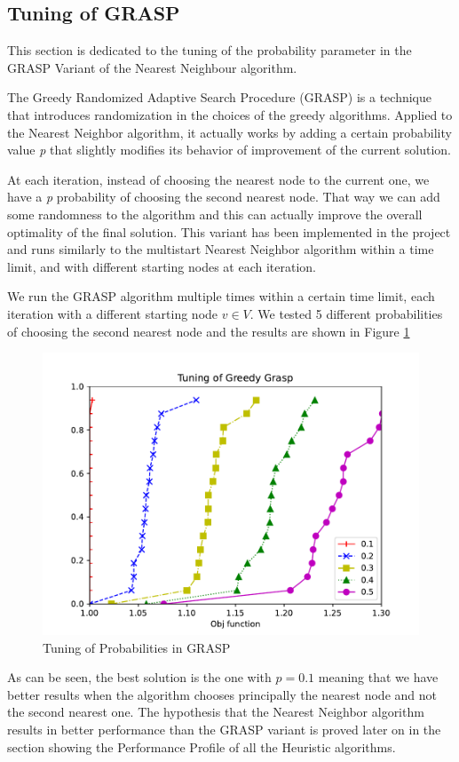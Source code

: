 \subsection{Tuning of GRASP}
This section is dedicated to the tuning of the probability parameter in the GRASP Variant of the Nearest Neighbour algorithm.

The Greedy Randomized Adaptive Search Procedure (GRASP) is a technique that introduces randomization in the choices of the greedy algorithms.
Applied to the Nearest Neighbor algorithm, it actually works by adding a certain probability value \textit{p} that slightly modifies its behavior of improvement of the current solution.

At each iteration, instead of choosing the nearest node to the current one, we have a \textit{p} probability of choosing the second nearest node. That way we can add some randomness to the algorithm and this can actually improve the overall optimality of the final solution.
This variant has been implemented in the project and runs similarly to the multistart Nearest Neighbor algorithm within a time limit, and with different starting nodes at each iteration.

We run the GRASP algorithm multiple times within a certain time limit, each iteration with a different starting node $v \in V$. We tested 5 different probabilities of choosing the second nearest node and the results are shown in Figure \ref*{fig:grasp}

\begin{figure}[!h]
    \centering
    \includegraphics[width=\textwidth]{images/grasp.pdf}
    \caption{Tuning of Probabilities in GRASP}
    \label{fig:grasp}
\end{figure}

As can be seen, the best solution is the one with $p = 0.1$ meaning that we have better results when the algorithm chooses principally the nearest node and not the second nearest one. The hypothesis that the Nearest Neighbor algorithm results in better performance than the GRASP variant is proved later on in the section showing the Performance Profile of all the Heuristic algorithms.


